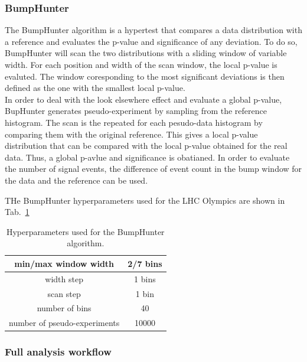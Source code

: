 \documentclass[letterpaper,11pt]{article}
\begin{document}
\subsubsection{BumpHunter}
\label{sec:BH}

\noindent The BumpHunter algorithm is a hypertest that compares a data distribution with a reference and evaluates the p-value and significance of any deviation.
To do so, BumpHunter will scan the two distributions with a sliding window of variable width.
For each position and width of the scan window, the local p-value is evaluted. The window coresponding to the most significant deviations is then defined as the one with the smallest local p-value.\\

\noindent In order to deal with the look elsewhere effect and evaluate a global p-value, BupHunter generates pseudo-experiment by sampling from the reference histogram.
The scan is the repeated for each pesudo-data histogram by comparing them with the original reference.
This gives a local p-value distribution that can be compared with the local p-value obtained for the real data.
Thus, a global p-avlue and significance is obatianed.
In order to evaluate the number of signal events, the difference of event count in the bump window for the data and the reference can be used.

\noindent THe BumpHunter hyperparameters used for the LHC Olympics are shown in Tab.~\ref{tab:param_BH}
\begin{table}[h!]
	\centering
	\begin{tabular}{|c|c|}
		\hline
		min/max window width & 2/7 bins \\
		\hline
		width step & 1 bins \\
		\hline
		scan step & 1 bin \\
		\hline
		number of bins & 40 \\
		\hline
		number of pseudo-experiments & 10000 \\
		\hline
	\end{tabular}
	\caption{Hyperparameters used for the BumpHunter algorithm.}
	\label{tab:param_BH}
\end{table}

\subsubsection{Full analysis workflow}
\end{document}
